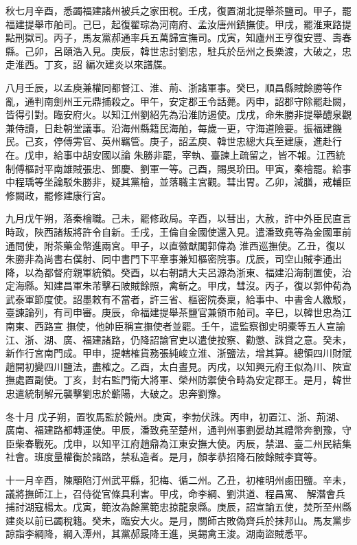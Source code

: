 \begin{pinyinscope}
 秋七月辛酉，悉蠲福建諸州被兵之家田稅。壬戌，復置湖北提舉茶鹽司。甲子，罷福建提舉市舶司。己巳，起復翟琮為河南府、孟汝唐州鎮撫使。甲戌，罷淮東路提點刑獄司。丙子，馬友黨郝通率兵五萬歸宣撫司。戊寅，知廬州王亨復安豐、壽春縣。己卯，呂頤浩入見。庚辰，韓世忠討劉忠，駐兵於岳州之長樂渡，大破之，忠走淮西。丁亥，詔
 編次建炎以來譜牒。



 八月壬辰，以孟庾兼權同都督江、淮、荊、浙諸軍事。癸巳，順昌縣賊餘勝等作亂，通判南劍州王元鼎捕殺之。甲午，安定郡王令話薨。丙申，詔郡守除罷赴闕，皆得引對。臨安府火。以知江州劉紹先為沿淮防遏使。戊戌，命朱勝非提舉醴泉觀兼侍讀，日赴朝堂議事。沿海州縣籍民海舶，每歲一更，守海道險要。振福建饑民。己亥，停傅雱官、英州羈管。庚子，詔孟庾、韓世忠總大兵至建康，進赴行在。戊申，給事中胡安國以論
 朱勝非罷，宰執、臺諫上疏留之，皆不報。江西統制傅樞討平南雄賊張忠、鄧慶、劉軍一等。己酉，賜吳玠田。甲寅，秦檜罷。給事中程瑀等坐論駁朱勝非，疑其黨檜，並落職主宮觀。彗出胃。乙卯，減膳，戒輔臣修闕政，罷修建康行宮。



 九月戊午朔，落秦檜職。己未，罷修政局。辛酉，以彗出，大赦，許中外臣民直言時政，陜西諸叛將許令自新。壬戌，王倫自金國使還入見。遣潘致堯等為金國軍前通問使，附茶藥金幣進兩宮。甲子，以直徽猷閣郭偉為
 淮西巡撫使。乙丑，復以朱勝非為尚書右僕射、同中書門下平章事兼知樞密院事。戊辰，司空山賊李通出降，以為都督府親軍統領。癸酉，以右朝請大夫呂源為浙東、福建沿海制置使，治定海縣。知建昌軍朱芾擊石陂賊餘照，禽斬之。甲戌，彗沒。丙子，復以郭仲荀為武泰軍節度使。詔墨敕有不當者，許三省、樞密院奏稟，給事中、中書舍人繳駁，臺諫論列，有司申審。庚辰，命福建提舉茶鹽官兼領市舶司。辛巳，以韓世忠為江南東、西路宣
 撫使，他帥臣稱宣撫使者並罷。壬午，遣監察御史明橐等五人宣諭江、浙、湖、廣、福建諸路，仍降詔諭官吏以遣使按察、勸懲、誅賞之意。癸未，新作行宮南門成。甲申，提轄榷貨務張純峻立淮、浙鹽法，增其算。總領四川財賦趙開初變四川鹽法，盡榷之。乙酉，太白晝見。丙戌，以知興元府王似為川、陜宣撫處置副使。丁亥，封右監門衛大將軍、榮州防禦使令畤為安定郡王。是月，韓世忠遣統制解元襲擊劉忠於蘄陽，大破之。忠奔劉豫。



 冬十月
 戊子朔，置牧馬監於饒州。庚寅，李勃伏誅。丙申，初置江、浙、荊湖、廣南、福建路都轉運使。甲辰，潘致堯至楚州，通判州事劉晏劫其禮幣奔劉豫，守臣柴春戰死。戊申，以知平江府趙鼎為江東安撫大使。丙辰，禁溫、臺二州民結集社會。班度量權衡於諸路，禁私造者。是月，顏孝恭招降石陂餘賊李寶等。



 十一月辛酉，陳顒陷汀州武平縣，犯梅、循二州。乙丑，初榷明州鹵田鹽。辛未，議將撫師江上，召侍從官條具利害。甲戌，命李綱、劉洪道、程昌寓、
 解潛會兵捕討湖寇楊太。戊寅，範汝為餘黨範忠掠龍泉縣。庚辰，詔宣諭五使，焚所至州縣建炎以前已蠲稅籍。癸未，臨安大火。是月，關師古敗偽齊兵於抹邦山。馬友黨步諒詣李綱降，綱入潭州，其黨郝晸降王進，吳錫禽王浚。湖南盜賊悉平。




\end{pinyinscope}
